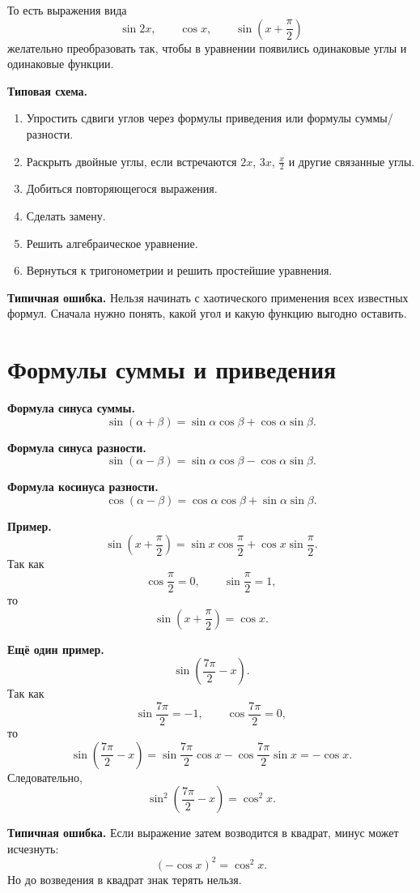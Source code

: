\documentclass[a4paper,12pt]{article}
\newcommand{\sectionline}{\vspace{1mm}{\color{accent}\hrule height 0.6pt}\vspace{2mm}}
\newcommand{\important}[1]{\textcolor{darkaccent}{\textbf{#1}}}
\newcommand{\warning}[1]{\textcolor{warn}{\textbf{#1}}}
\begin{document}
То есть выражения вида
\[
\sin 2x,\qquad \cos x,\qquad \sin\left(x+\frac{\pi}{2}\right)
\]
желательно преобразовать так, чтобы в уравнении появились одинаковые углы и одинаковые функции.

\important{Типовая схема.}
\begin{enumerate}
\item Упростить сдвиги углов через формулы приведения или формулы суммы/разности.
\item Раскрыть двойные углы, если встречаются \(2x\), \(3x\), \(\frac{x}{2}\) и другие связанные углы.
\item Добиться повторяющегося выражения.
\item Сделать замену.
\item Решить алгебраическое уравнение.
\item Вернуться к тригонометрии и решить простейшие уравнения.
\end{enumerate}

\warning{Типичная ошибка.}
Нельзя начинать с хаотического применения всех известных формул. Сначала нужно понять, какой угол и какую функцию выгодно оставить.

\section{Формулы суммы и приведения}
\sectionline

\important{Формула синуса суммы.}
\[
\sin(\alpha+\beta)=\sin\alpha\cos\beta+\cos\alpha\sin\beta.
\]

\important{Формула синуса разности.}
\[
\sin(\alpha-\beta)=\sin\alpha\cos\beta-\cos\alpha\sin\beta.
\]

\important{Формула косинуса разности.}
\[
\cos(\alpha-\beta)=\cos\alpha\cos\beta+\sin\alpha\sin\beta.
\]

\important{Пример.}
\[
\sin\left(x+\frac{\pi}{2}\right)
=
\sin x\cos\frac{\pi}{2}+\cos x\sin\frac{\pi}{2}.
\]
Так как
\[
\cos\frac{\pi}{2}=0,\qquad \sin\frac{\pi}{2}=1,
\]
то
\[
\sin\left(x+\frac{\pi}{2}\right)=\cos x.
\]

\important{Ещё один пример.}
\[
\sin\left(\frac{7\pi}{2}-x\right).
\]
Так как
\[
\sin\frac{7\pi}{2}=-1,\qquad \cos\frac{7\pi}{2}=0,
\]
то
\[
\sin\left(\frac{7\pi}{2}-x\right)
=
\sin\frac{7\pi}{2}\cos x-\cos\frac{7\pi}{2}\sin x
=
-\cos x.
\]
Следовательно,
\[
\sin^2\left(\frac{7\pi}{2}-x\right)=\cos^2x.
\]

\warning{Типичная ошибка.}
Если выражение затем возводится в квадрат, минус может исчезнуть:
\[
(-\cos x)^2=\cos^2x.
\]
Но до возведения в квадрат знак терять нельзя.
\end{document}

